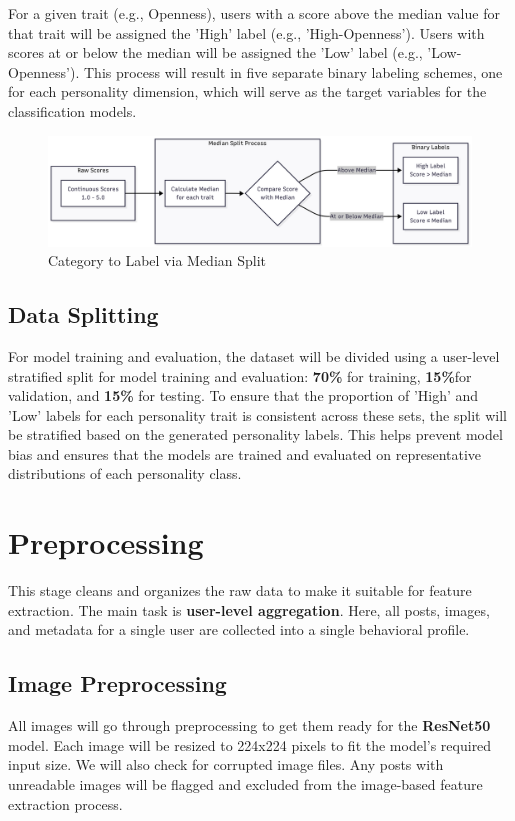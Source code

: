 For a given trait (e.g., Openness), users with a score above the median value for that trait will be assigned the 'High' label (e.g., 'High-Openness'). Users with scores at or below the median will be assigned the 'Low' label (e.g., 'Low-Openness'). This process will result in five separate binary labeling schemes, one for each personality dimension, which will serve as the target variables for the classification models.

\begin{figure}[H]
	\centering
	\includegraphics[width=1\textwidth]{"figures/Scores.png"}
	\caption{Category to Label via Median Split}
	\label{fig:median_split_diagram}
\end{figure}


\subsection{Data Splitting}
For model training and evaluation, the dataset will be divided using a user-level stratified split for model training and evaluation: \textbf{70\%} for training, \textbf{15\%}for validation, and \textbf{15\%} for testing. To ensure that the proportion of 'High' and 'Low' labels for each personality trait is consistent across these sets, the split will be stratified based on the generated personality labels. This helps prevent model bias and ensures that the models are trained and evaluated on representative distributions of each personality class.

\section{Preprocessing}
This stage cleans and organizes the raw data to make it suitable for feature extraction. The main task is \textbf{user-level aggregation}. Here, all posts, images, and metadata for a single user are collected into a single behavioral profile. 

\subsection{Image Preprocessing}
All images will go through preprocessing to get them ready for the \textbf{ResNet50} model. Each image will be resized to 224x224 pixels to fit the model’s required input size. We will also check for corrupted image files. Any posts with unreadable images will be flagged and excluded from the image-based feature extraction process.

